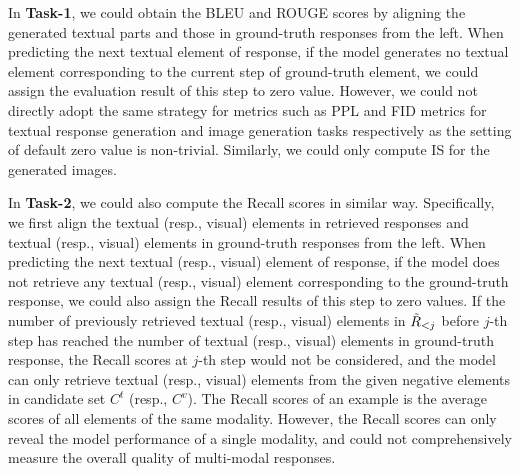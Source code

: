 \documentclass[11pt]{article}
\begin{document}
In \textbf{Task-1}, we could obtain the BLEU and ROUGE scores by aligning the generated textual parts and those in ground-truth responses from the left. When predicting the next textual element of response, if the model generates no textual element corresponding to the current step of ground-truth element, we could assign the evaluation result of this step to zero value. However, we could not directly adopt the same strategy for metrics such as PPL and FID metrics for textual response generation and image generation tasks respectively as the setting of default zero value is non-trivial. Similarly, we could only compute IS for the generated images. 



In \textbf{Task-2}, we could also compute the Recall scores in similar way. Specifically, we first align the textual (resp., visual) elements in retrieved responses and textual (resp., visual) elements in ground-truth responses from the left. When predicting the next textual (resp., visual) element of response, if the model does not retrieve any textual (resp., visual) element corresponding to the ground-truth response, we could also assign the Recall results of this step to zero values. If the number of previously retrieved textual (resp., visual) elements in $\Tilde{R}_{<j}$ before $j$-th step has reached the number of textual (resp., visual) elements in ground-truth response, the Recall scores at $j$-th step would not be considered, and the model can only retrieve textual (resp., visual) elements from the given negative elements in candidate set $C^t$ (resp., $C^v$). The Recall scores of an example is the average scores of all elements of the same modality. However, the Recall scores can only reveal the model performance of a single modality, and could not comprehensively measure the overall quality of multi-modal responses.
\end{document}
